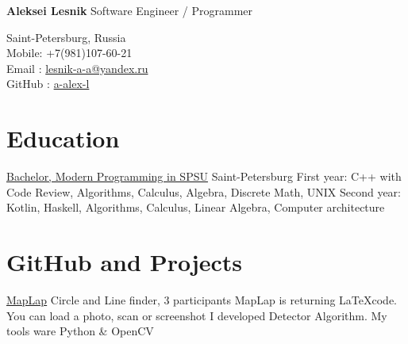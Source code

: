 \documentclass[12pt,a4paper]{moderncv}
\begin{document}

	\begin{minipage} {0.7\textwidth}
		\begin{flushleft}
			\huge \textbf{Aleksei Lesnik} 
			\newline
			\textcolor[gray]{0.4} {
			    \indent Software Engineer / Programmer\\
			}
			\normalsize
		\end{flushleft}
	\end{minipage}
	\begin{minipage} {0.3\textwidth}
		\begin{flushright}
			\textcolor[gray]{0.4} {
				\indent Saint-Petersburg, Russia\\
				\indent Mobile: +7(981)107-60-21  \\
				\indent Email : \href{mailto:lesnik-a-a@yandex.ru} {lesnik-a-a@yandex.ru}\\ 
				\indent GitHub : \href{https://github.com/a-alex-l} {a-alex-l}\\  	
			}
		\end{flushright}
	\end{minipage}

    \section{Education}
    
            {\href {http://english.spbu.ru/education/undergraduate/bachelor/85-program-bac/2496-modern-programming}
                {Bachelor, Modern Programming in SPSU}}
            {}{}
            {Saint-Petersburg}
            {First year: C++ with Code Review, Algorithms, Calculus, Algebra, Discrete Math, UNIX\newline
             Second year: Kotlin, Haskell, Algorithms, Calculus, Linear Algebra, Computer architecture}
        
    \section{GitHub and Projects}
        
            {\href {https://github.com/a-alex-l/MapLap} {MapLap}} {Circle and Line finder, 3 participants}
            {\newline MapLap is returning \LaTeX code. You can load a photo, scan or screenshot} {}
            {I developed Detector Algorithm. My tools ware \textcolor{Attention} {Python \& OpenCV} }
        
\end{document}
